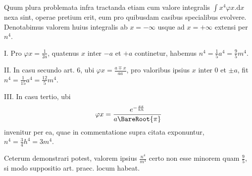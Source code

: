 Quum plura problemata infra tractanda etiam cum valore integralis \(\int x^4\varphi x.\mathrm{d}x\) nexa sint, operae pretium erit, eum pro quibusdam casibus specialibus evolvere. Denotabimus valorem huius integralis ab \(x=-\infty\) usque ad \(x=+\infty\) extensi per \(n^4\).

I. Pro \(\varphi x=\tfrac1{2a}\), quatenus \(x\) inter \(-a\) et \(+a\) continetur, habemus \(n^4=\tfrac15a^4=\tfrac95m^4\).

II. In casu secundo art. 6, ubi \(\varphi x=\frac{a\mp x}{aa}\), pro valoribus ipsius \(x\) inter \(0\) et \(\pm a\), fit \(n^4=\tfrac1{15}a^4=\tfrac{12}{5}m^4\).

III. In casu tertio, ubi
\[
\varphi x=\frac{e^{-\frac{xx}{hh}}}{a\BareRoot{\pi}}
\]
invenitur per ea, quae in commentatione supra citata exponuntur, \(n^4=\tfrac34h^4=3m^4\).

Ceterum demonstrari potest, valorem ipsius \(\frac{n^4}{m^4}\) certo non esse minorem quam \(\tfrac95\), si modo suppositio art. praec. locum habeat.

